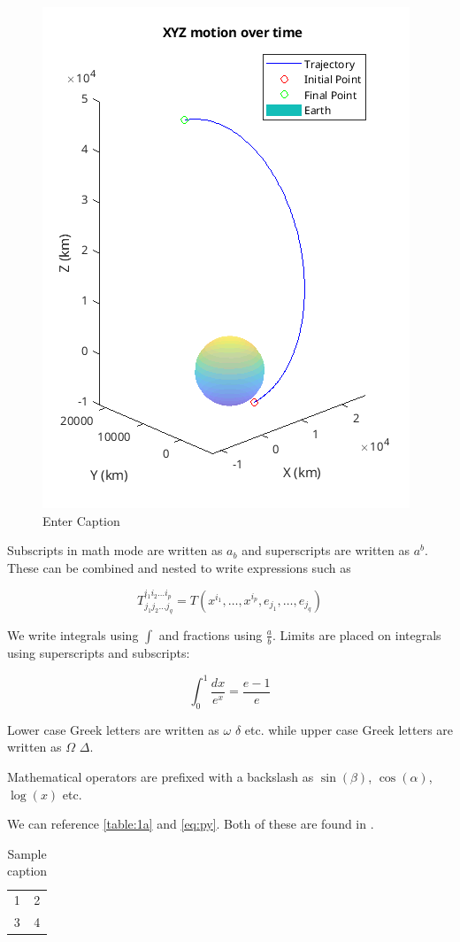 \documentclass[12pt, letterpaper]{article}
\begin{document}
\begin{figure}[t]
    \centering
    \includegraphics[width=0.5\linewidth]{transfer.png}
    \caption{Enter Caption}
    \label{fig:transfer}
\end{figure}

Subscripts in math mode are written as $a_b$ and superscripts are written as $a^b$. These can be combined and nested to write expressions such as

\[ T^{i_1 i_2 \dots i_p}_{j_1 j_2 \dots j_q} = T(x^{i_1},\dots,x^{i_p},e_{j_1},\dots,e_{j_q}) \]

We write integrals using $\int$ and fractions using $\frac{a}{b}$. Limits are placed on integrals using superscripts and subscripts:

\[ \int_0^1 \frac{dx}{e^x} =  \frac{e-1}{e} \]

Lower case Greek letters are written as $\omega$ $\delta$ etc. while upper case Greek letters are written as $\Omega$ $\Delta$.

Mathematical operators are prefixed with a backslash as $\sin(\beta)$, $\cos(\alpha)$, $\log(x)$ etc.

We can reference \autoref{table:1a} and \autoref{eq:py}. Both of these are found in .

\begin{table}[h!]
\centering
\begin{tabular}{c|c}
    1 & 2 \\
    3 & 4
\end{tabular}
\caption{Sample caption}
\label{table:1a}
\end{table}
\end{document}
